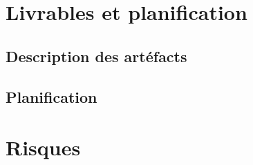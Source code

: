 \documentclass[letterpaper
, twoside
, 12pt
,these
,francais
,creativecommons,hyperref
]{thETS}
\begin{document}
\chapter{Livrables et planification}

\section{Description des artéfacts}


\section{Planification}


\chapter{Risques}



\end{document}
